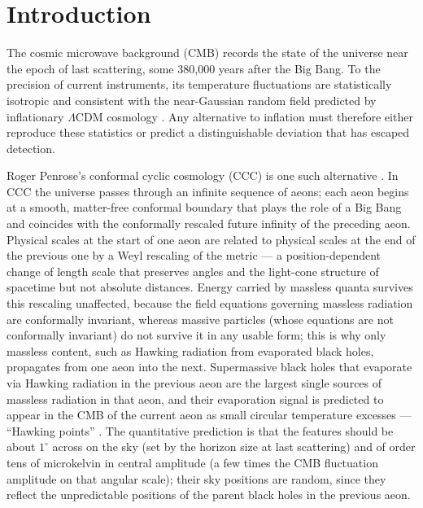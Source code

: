 \documentclass[11pt,a4paper]{article}
\begin{document}
\begin{abstract}
\smallskip
\noindent\textbf{Keywords:} cosmic microwave background; cosmology: observations; cosmology: theory; conformal cyclic cosmology; Hawking points; methods: statistical; methods: data analysis; machine learning
\end{abstract}

\section{Introduction}\label{sec:intro}

The cosmic microwave background (CMB) records the state of the universe near the epoch of last scattering, some 380{,}000 years after the Big Bang. To the precision of current instruments, its temperature fluctuations are statistically isotropic and consistent with the near-Gaussian random field predicted by inflationary $\Lambda$CDM cosmology \citep{planck2018_i,planck2018_vi}. Any alternative to inflation must therefore either reproduce these statistics or predict a distinguishable deviation that has escaped detection.

Roger Penrose's conformal cyclic cosmology (CCC) is one such alternative \citep{penrose_ccc_2010}. In CCC the universe passes through an infinite sequence of aeons; each aeon begins at a smooth, matter-free conformal boundary that plays the role of a Big Bang and coincides with the conformally rescaled future infinity of the preceding aeon. Physical scales at the start of one aeon are related to physical scales at the end of the previous one by a Weyl rescaling of the metric --- a position-dependent change of length scale that preserves angles and the light-cone structure of spacetime but not absolute distances. Energy carried by massless quanta survives this rescaling unaffected, because the field equations governing massless radiation are conformally invariant, whereas massive particles (whose equations are not conformally invariant) do not survive it in any usable form; this is why only massless content, such as Hawking radiation from evaporated black holes, propagates from one aeon into the next. Supermassive black holes that evaporate via Hawking radiation \citep{hawking_1975} in the previous aeon are the largest single sources of massless radiation in that aeon, and their evaporation signal is predicted to appear in the CMB of the current aeon as small circular temperature excesses --- ``Hawking points'' \citep{an_amnp_2018}. The quantitative prediction is that the features should be about $1^\circ$ across on the sky (set by the horizon size at last scattering) and of order tens of microkelvin in central amplitude (a few times the CMB fluctuation amplitude on that angular scale); their sky positions are random, since they reflect the unpredictable positions of the parent black holes in the previous aeon.
\end{document}
